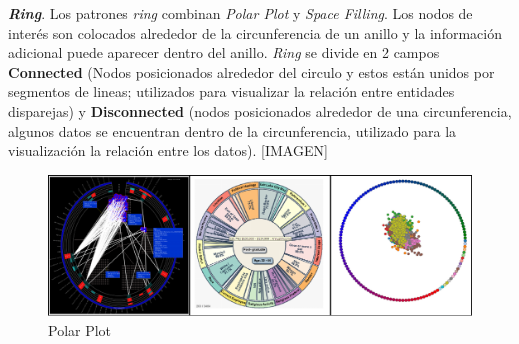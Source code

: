 \textbf{\textit{Ring}}. Los patrones \textit{ring} combinan \textit{Polar Plot} y \textit{Space Filling}. Los nodos de interés son colocados alrededor de la circunferencia de un anillo y la información adicional puede aparecer dentro del anillo. \textit{Ring} se divide en 2 campos \textbf{Connected} (Nodos posicionados alrededor del circulo y estos están unidos por segmentos de lineas; utilizados para visualizar la relación entre entidades disparejas) y \textbf{Disconnected} (nodos posicionados alrededor de una circunferencia, algunos datos se encuentran dentro de la circunferencia, utilizado para la visualización la relación entre los datos).
\textcolor[rgb]{0.2,0.8,0.2}{[IMAGEN]}
\begin{figure}[!h]
\centering
\includegraphics[width=0.6\columnwidth]{figs/Ring}%
\caption{Polar Plot}%
\label{fig:Ring}%
\end{figure}

